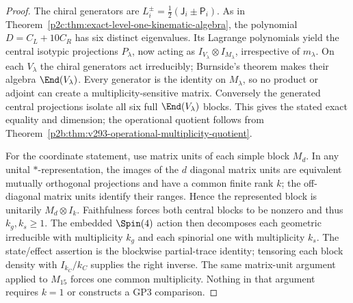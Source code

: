 \documentclass[12pt,a4paper]{article}
\begin{document}
\begin{proof}
The chiral generators are $L_i^\pm=\tfrac12(\mathsf J_i\pm\mathsf P_i)$.
As in Theorem~\ref{p2c:thm:exact-level-one-kinematic-algebra}, the
polynomial $D=C_L+10C_R$ has six distinct eigenvalues. Its Lagrange
polynomials yield the central isotypic projections $P_\lambda$, now
acting as $I_{V_\lambda}\otimes I_{M_\lambda}$, irrespective of
$m_\lambda$. On each $V_\lambda$ the chiral generators act
irreducibly; Burnside's theorem makes their algebra $\End(V_\lambda)$.
Every generator is the identity on $M_\lambda$, so no product or adjoint
can create a multiplicity-sensitive matrix. Conversely the generated
central projections isolate all six full $\End(V_\lambda)$ blocks.
This gives the stated exact equality and dimension; the operational
quotient follows from Theorem~\ref{p2b:thm:v293-operational-multiplicity-quotient}.

For the coordinate statement, use matrix units of each simple block
$M_d$. In any unital $*$-representation, the images of the $d$ diagonal
matrix units are equivalent mutually orthogonal projections and have
a common finite rank $k$; the off-diagonal matrix units identify their
ranges. Hence the represented block is unitarily $M_d\otimes I_k$.
Faithfulness forces both central blocks to be nonzero and thus
$k_g,k_s\ge1$. The embedded $\Spin(4)$ action then decomposes each
geometric irreducible with multiplicity $k_g$ and each spinorial one
with multiplicity $k_s$. The state/effect assertion is the blockwise partial-trace identity;
tensoring each block density with $I_{k_C}/k_C$ supplies the right
inverse. The same matrix-unit argument applied to
$M_{15}$ forces one common multiplicity. Nothing in that argument
requires $k=1$ or constructs a GP3 comparison.
\end{proof}
\end{document}
